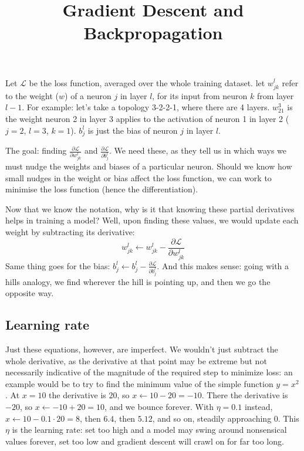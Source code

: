 \documentclass{article}
\begin{document}
\title{Gradient Descent and Backpropagation}
\author{}
\date{}
\maketitle

Let $\mathcal{L}$ be the loss function, averaged over the whole training dataset. let $w^l_{jk}$ refer to the weight ($w$) of a neuron $j$ in layer $l$, for its input from neuron $k$ from layer $l - 1$. For example: let's take a topology 3-2-2-1, where there are 4 layers. $w^3_{21}$ is the weight neuron 2 in layer 3 applies to the activation of neuron 1 in layer 2 ($j = 2$, $l = 3$, $k = 1$). $b^l_j$ is just the bias of neuron $j$ in layer $l$. 

The goal: finding $\frac{\partial \mathcal{L}}{\partial w^{l}_{jk}}$ and $\frac{\partial \mathcal{L}}{\partial b^{l}_{j}}$. We need these, as they tell us in which ways we must nudge the weights and biases of a particular neuron. Should we know how small nudges in the weight or bias affect the loss function, we can work to minimise the loss function (hence the differentiation).

Now that we know the notation, why is it that knowing these partial derivatives helps in training a model? Well, upon finding these values, we would update each weight by subtracting its derivative: \[w^{l}_{jk} \leftarrow w^{l}_{jk} - \frac{\partial \mathcal{L}}{\partial w^{l}_{jk}}\]
Same thing goes for the bias: $b^l_j \leftarrow b^l_j - \frac{\partial \mathcal{L}}{\partial b^{l}_{j}}$.
And this makes sense: going with a hills analogy, we find wherever the hill is pointing up, and then we go the opposite way.

\subsection*{Learning rate}
Just these equations, however, are imperfect. We wouldn't just subtract the whole derivative, as the derivative at that point may be extreme but not necessarily indicative of the magnitude of the required step to minimize loss: an example would be to try to find the minimum value of the simple function $y = x^2$. At $x = 10$ the derivative is 20, so $x \leftarrow 10 - 20 = -10$. There the derivative is $-20$, so $x \leftarrow -10 + 20 = 10$, and we bounce forever. With $\eta = 0.1$ instead, $x \leftarrow 10 - 0.1 \cdot 20 = 8$, then $6.4$, then $5.12$, and so on, steadily approaching 0. This $\eta$ is the learning rate: set too high and a model may swing around nonsensical values forever, set too low and gradient descent will crawl on for far too long.
\end{document}
